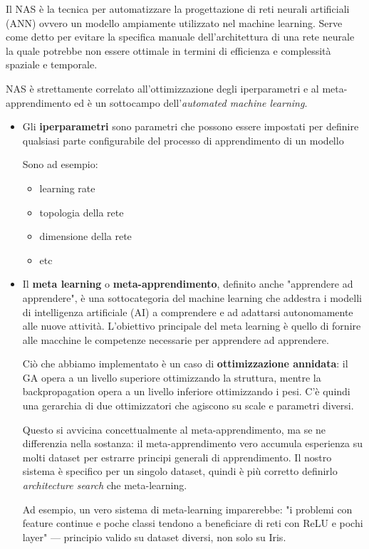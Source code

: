\documentclass[12pt, a4paper]{article}
\begin{document}
Il NAS è la tecnica per automatizzare la progettazione di reti neurali artificiali (ANN) ovvero un modello ampiamente utilizzato nel machine learning. Serve come detto per evitare la specifica manuale dell'architettura di una rete neurale la quale potrebbe non essere ottimale in termini di efficienza e complessità spaziale e temporale.

NAS è strettamente correlato all'ottimizzazione degli iperparametri e al meta-apprendimento ed è un sottocampo dell'\textit{automated machine learning}.

\begin{itemize}
    \item Gli \textbf{iperparametri} sono parametri che possono essere impostati per definire qualsiasi parte configurabile del processo di apprendimento di un modello
    
    Sono ad esempio:

    \begin{itemize}
        \item learning rate
        \item topologia della rete
        \item dimensione della rete
        \item etc
    \end{itemize}
    
    \item Il \textbf{meta learning} o \textbf{meta-apprendimento}, definito anche "apprendere ad apprendere", è una sottocategoria del machine learning che addestra i modelli di intelligenza artificiale (AI) a comprendere e ad adattarsi autonomamente alle nuove attività. L'obiettivo principale del meta learning è quello di fornire alle macchine le competenze necessarie per apprendere ad apprendere.
    
    Ciò che abbiamo implementato è un caso di \textbf{ottimizzazione annidata}: il GA opera a un livello superiore ottimizzando la struttura, mentre la backpropagation opera a un livello inferiore ottimizzando i pesi. C'è quindi una gerarchia di due ottimizzatori che agiscono su scale e parametri diversi.

    Questo si avvicina concettualmente al meta-apprendimento, ma se ne differenzia nella sostanza: il meta-apprendimento vero accumula esperienza su molti dataset per estrarre principi generali di apprendimento. Il nostro sistema è specifico per un singolo dataset, quindi è più corretto definirlo \textit{architecture search} che meta-learning.

    Ad esempio, un vero sistema di meta-learning imparerebbe: "i problemi con feature continue e poche classi tendono a beneficiare di reti con ReLU e pochi layer" --- principio valido su dataset diversi, non solo su Iris.
\end{itemize}
\end{document}
